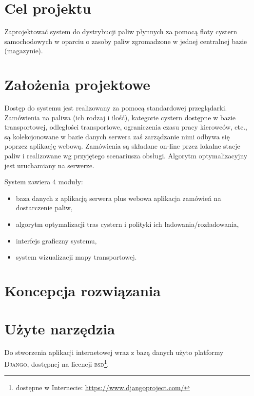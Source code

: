 \documentclass[11pt,a4paper,oneside]{mwart}
\begin{document}


\newpage
\thispagestyle{empty}
\newpage

\setcounter{tocdepth}{3}
\tableofcontents
\newpage


\section{Cel projektu}
Zaprojektować system do dystrybucji paliw płynnych za pomocą floty cystern samochodowych w oparciu o zasoby paliw zgromadzone w jednej centralnej bazie (magazynie).

\section{Założenia projektowe}
Dostęp do systemu jest realizowany za pomocą standardowej przeglądarki. Zamówienia na paliwa (ich rodzaj i ilość), kategorie cystern dostępne w bazie transportowej, odległości transportowe, ograniczenia czasu pracy kierowców, etc., są kolekcjonowane w bazie danych serwera zaś zarządzanie nimi odbywa się poprzez aplikację webową. Zamówienia są składane on-line przez lokalne stacje paliw i realizowane wg przyjętego scenariusza obsługi. Algorytm optymalizacyjny jest uruchamiany na serwerze.

System zawiera 4 moduły: 
\begin{itemize}
  \item baza danych z aplikacją serwera plus webowa aplikacja zamówień na dostarczenie paliw, 
  \item algorytm optymalizacji tras cystern i polityki ich ładowania/rozładowania, 
  \item interfejs graficzny systemu, 
  \item system wizualizacji mapy transportowej.
\end{itemize}


\section {Koncepcja rozwiązania}

\section{Użyte narzędzia}
Do stworzenia aplikacji internetowej wraz z bazą danych użyto platformy \textsc{Django}, dostępnej na licencji \textsc{bsd}\footnote{dostępne w Internecie: \url{https://www.djangoproject.com/}}. 
\end{document}
